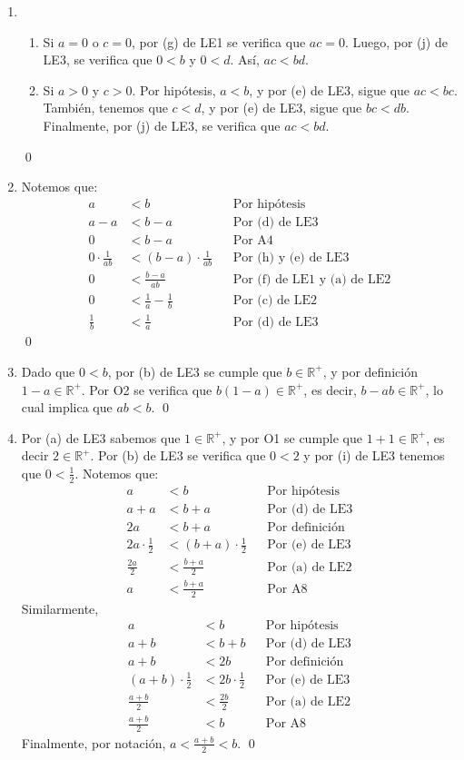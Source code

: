 \documentclass[11pt]{article}
\newcommand{\R}{\mathbb{R}}
\begin{document}
\begin{enumerate}[label=\alph*)]
\item 
\begin{enumerate}[label=\roman*)]
    \item Si $a=0$ o $c=0$, por (g) de LE1 se verifica que $ac=0$. Luego, por (j) de LE3, se verifica que $0<b$ y $0<d$. Así, $ac<bd$.
    \item Si $a>0$ y $c>0$. Por hipótesis, $a<b$, y por (e) de LE3, sigue que $ac<bc$. También, tenemos que $c<d$, y por (e) de LE3, sigue que $bc<db$. Finalmente, por (j) de LE3, se verifica que $ac<bd$.
\end{enumerate} \qed
    \item Notemos que:
    \begin{align*}
    a &< b && \text{Por hipótesis} \\
    a-a &< b-a && \text{Por (d) de LE3} \\
    0 &< b-a && \text{Por A4} \\
    0 \cdot \frac{1}{ab} &< (b-a) \cdot \frac{1}{ab} && \text{Por (h) y (e) de LE3}\\
    0 &< \frac{b-a}{ab} && \text{Por (f) de LE1 y (a) de LE2}\\
    0 &< \frac{1}{a} - \frac{1}{b} && \text{Por (c) de LE2}\\
    \frac{1}{b} &< \frac{1}{a} && \text{Por (d) de LE3}
    \end{align*} \qed
\item Dado que $0<b$, por (b) de LE3 se cumple que $b \in \R^+$, y por definición $1-a \in \R^+$. Por O2 se verifica que $b(1-a) \in \R^+$, es decir, $b-ab \in \R^+$, lo cual implica que $ab<b$. \qed
    \item Por (a) de LE3 sabemos que $1 \in \R^+$, y por O1 se cumple que $1+1 \in \R^+$, es decir $2 \in \R^+$. Por (b) de LE3 se verifica que $0<2$ y por (i) de LE3 tenemos que $0<\frac{1}{2}$. Notemos que: \begin{align*}
        a &< b && \text{Por hipótesis} \\
        a + a &< b+a && \text{Por (d) de LE3} \\
        2a &< b+a && \text{Por definición} \\
        2a \cdot \frac{1}{2} &< (b+a) \cdot \frac{1}{2} && \text{Por (e) de LE3} \\
        \frac{2a}{2} &< \frac{b+a}{2} && \text{Por (a) de LE2} \\
        a &< \frac{b+a}{2} && \text{Por A8}
    \end{align*} Similarmente,
    \begin{align*}
        a &< b && \text{Por hipótesis} \\
        a + b &< b+b && \text{Por (d) de LE3} \\
        a +b &< 2b && \text{Por definición} \\
        (a+b) \cdot \frac{1}{2} &< 2b \cdot \frac{1}{2} && \text{Por (e) de LE3} \\
        \frac{a+b}{2} &< \frac{2b}{2} && \text{Por (a) de LE2} \\
        \frac{a+b}{2} &< b && \text{Por A8}
    \end{align*} Finalmente, por notación, $a < \frac{a+b}{2} < b$. \qed


\end{enumerate}
\end{document}
